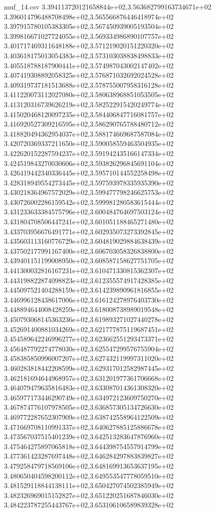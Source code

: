 \begin{filecontents*}{muf_14.csv}
3.394113720121658844e+02,3.563682799163734671e+02
3.396014796488708498e+02,3.565566876446418974e+02
3.397915780105383305e+02,3.567450939005193504e+02
3.399816671027724055e+02,3.569334986890107757e+02
3.401717469311648188e+02,3.571219020151220320e+02
3.403618175013054383e+02,3.573103038838498833e+02
3.405518788187900441e+02,3.574987043002147402e+02
3.407419308892058325e+02,3.576871032692024528e+02
3.409319737181513688e+02,3.578755007958316128e+02
3.411220073112027080e+02,3.580638968851053505e+02
3.413120316739626219e+02,3.582522915420249774e+02
3.415020468120097235e+02,3.584406847716081757e+02
3.416920527309216595e+02,3.586290765788480712e+02
3.418820494362954037e+02,3.588174669687587084e+02
3.420720369337211650e+02,3.590058559463504935e+02
3.422620152287594237e+02,3.591942435166147334e+02
3.424519843270030606e+02,3.593826296845691104e+02
3.426419442340336445e+02,3.595710144552258498e+02
3.428318949554273445e+02,3.597593978335935390e+02
3.430218364967572029e+02,3.599477798246625753e+02
3.430726002286159542e+02,3.599981280583615444e+02
3.431233633384575796e+02,3.600484764697503124e+02
3.431804708506447241e+02,3.601051188465271480e+02
3.433703956676491771e+02,3.602935073273392845e+02
3.435603113160776729e+02,3.604819029884638439e+02
3.437502177991167400e+02,3.606703058326838800e+02
3.439401151199008950e+02,3.608587158627751705e+02
3.441300032816167231e+02,3.610471330815362307e+02
3.443198822874098823e+02,3.612355574917428385e+02
3.445097521404288159e+02,3.614239890961816855e+02
3.446996128438617006e+02,3.616124278976403730e+02
3.448894644008428259e+02,3.618008738989019548e+02
3.450793068145363236e+02,3.619893271027440278e+02
3.452691400881034269e+02,3.621777875119687451e+02
3.454589642246996277e+02,3.623662551293473371e+02
3.456487792274778030e+02,3.625547299576755904e+02
3.458385850996007207e+02,3.627432119997311020e+02
3.460283818442208599e+02,3.629317012582987445e+02
3.462181694644968957e+02,3.631201977361706668e+02
3.464079479635816483e+02,3.633087014361308320e+02
3.465977173446290749e+02,3.634972123609750270e+02
3.467874776107978505e+02,3.636857305134726630e+02
3.469772287652307909e+02,3.638742558964122509e+02
3.471669708110991337e+02,3.640627885125886678e+02
3.473567037515401239e+02,3.642513283647876960e+02
3.475464275897065818e+02,3.644398754557914799e+02
3.477361423287697448e+02,3.646284297883839827e+02
3.479258479718569106e+02,3.648169913653637195e+02
3.480650404598200112e+02,3.649553547778059510e+02
3.481529118844138111e+02,3.650427074502385949e+02
3.482326969015152827e+02,3.651220251687846030e+02
3.484223787255443767e+02,3.653106106589839328e+02

\end{filecontents*}
